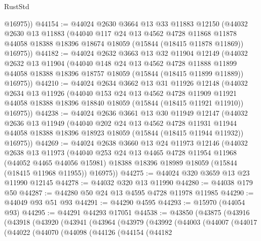 \begin{lexlean}{RustStd}
\begin{coremodule}
        @16975))
@44154 := @44024
    @2630
    @3664
    @13
    @33
    @11883
    @12150
    (@44032
      @2630
      @13
      @11883
      (@44040
        @117
        @24
        @13
        @4562
        @4728
        @11868
        @11878
        @44058
        @18388
        @18396
        @18674
        @18059
        (@15844 (@18415 @11878 @11869))
        @16975))
@44182 := @44024
    @2632
    @3663
    @13
    @32
    @11904
    @12149
    (@44032
      @2632
      @13
      @11904
      (@44040
        @148
        @24
        @13
        @4562
        @4728
        @11888
        @11899
        @44058
        @18388
        @18396
        @18757
        @18059
        (@15844 (@18415 @11899 @11889))
        @16975))
@44210 := @44024
    @2634
    @3662
    @13
    @31
    @11926
    @12148
    (@44032
      @2634
      @13
      @11926
      (@44040
        @153
        @24
        @13
        @4562
        @4728
        @11909
        @11921
        @44058
        @18388
        @18396
        @18840
        @18059
        (@15844 (@18415 @11921 @11910))
        @16975))
@44238 := @44024
    @2636
    @3661
    @13
    @30
    @11949
    @12147
    (@44032
      @2636
      @13
      @11949
      (@44040
        @202
        @24
        @13
        @4562
        @4728
        @11931
        @11944
        @44058
        @18388
        @18396
        @18923
        @18059
        (@15844 (@18415 @11944 @11932))
        @16975))
@44269 := @44024
    @2638
    @3660
    @13
    @24
    @11973
    @12146
    (@44032
      @2638
      @13
      @11973
      (@44040
        @253
        @24
        @13
        @4465
        @4728
        @11954
        @11968
        (@44052 @4465 @44056 @15981)
        @18388
        @18396
        @18989
        @18059
        (@15844 (@18415 @11968 @11955))
        @16975))
@44275 := @44024 @320 @3659 @13 @23 @11990 @12145
@44278 := @44032 @320 @13 @11990
@44280 := @44038 @179 @50
@44287 := @44280 @50 @24 @13 @4595 @4728 @11978 @11985
@44290 := @44049 @93 @51 @93
@44291 := @44290 @4595
@44293 := @15970 (@44054 @93)
@44295 := @44291 @44293 @17051
@44538 := @43850
    (@43875
      (@43916
        (@43918
          (@43920
            (@43941
              (@43964
                (@43979
                  (@43992
                    (@44003
                      (@44007
                        (@44017
                          (@44022
                            (@44070
                              (@44098
                                (@44126
                                  (@44154
                                    (@44182

\end{coremodule}
\end{lexlean}
